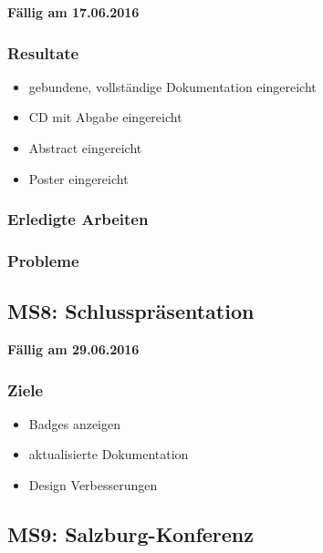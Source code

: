 \textbf{Fällig am 17.06.2016}

\subsubsection{Resultate}

\begin{itemize}
	\item gebundene, vollständige Dokumentation eingereicht
	\item CD mit Abgabe eingereicht
	\item Abstract eingereicht
	\item Poster eingereicht
\end{itemize}

\subsubsection{Erledigte Arbeiten}


\subsubsection{Probleme}


\subsection{MS8: Schlusspräsentation}
\label{pm-m8}

\textbf{Fällig am 29.06.2016}

\subsubsection{Ziele}

\begin{itemize}
	\item Badges anzeigen
	\item aktualisierte Dokumentation
	\item Design Verbesserungen
\end{itemize}

\subsection{MS9: Salzburg-Konferenz}
\label{pm-ms9}
